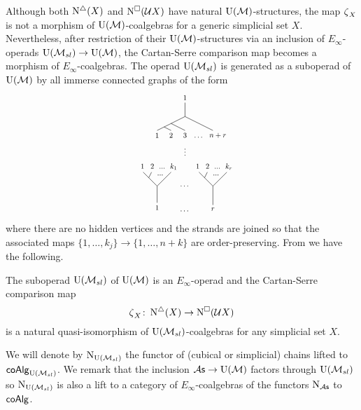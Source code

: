 Although both $\operatorname{N^{\triangle}}(X)$ and $\operatorname{N^{\square}}(\mathcal{U} X)$ have natural ${\operatorname{U}(\mathcal{M})}$-structures, the map $\operatorname{\zeta}_X$ is not a morphism of ${\operatorname{U}(\mathcal{M})}$-coalgebras for a generic simplicial set $X$.
Nevertheless, after restriction of their ${\operatorname{U}(\mathcal{M})}$-structures via an inclusion of $E_\infty$-operads ${\operatorname{U}(\mathcal{M}_{sl})} \to {\operatorname{U}(\mathcal{M})}$, the Cartan-Serre comparison map becomes a morphism of $E_\infty$-coalgebras.
The operad ${\operatorname{U}(\mathcal{M}_{sl})}$ is generated as a suboperad of ${\operatorname{U}(\mathcal{M})}$ by all immerse connected graphs of the form
\begin{equation*}
\begin{tikzpicture}[scale=1]
\draw (0,0)--(0,-.6) node[below, scale=.75]{$1$};
\draw (0,0)--(.5,.5);
\draw (-.3, .3)-- (-.2,.5) node[scale=.75] at (-.2,.7) {\qquad $1\, \ \ 2\ \ ...\ \ k_1$};
\draw (-.5,.5)--(0,0);
\node[scale=.75] at (.11,.4){$..$.};

\node[scale=.75] at (1,0){$\cdots$};
\node[scale=.75] at (1,-.9){$\cdots$};

\draw (2,0)--(2,-.68) node[scale=.75, below]{$r$};
\draw (2,0)--(2.5,.5);
\draw (1.7, .3)--(1.8,.5) node[scale=.75] at (1.78,.7) {\qquad $1\, \ \ 2\ \ ...\ \ k_r$};
\draw (1.5,.5)--(2,0);
\node[scale=.75] at (2.11,.4){$..$.};

\draw (1,2.5)--(1,3) node[scale=.75, above]{$1$};
\draw (1,2.5)--(0,2) node[scale=.75, below]{$1$};
\draw (.25,2.125)--(.5,2) node[scale=.75, below]{$2$};
\draw (.5,2.25)--(1,2) node[scale=.75, below]{$3$};
\draw (1,2.5)--(2,2) node[scale=.75, below]{\ \quad $n + r$};
\node[scale=.75] at (1.5,1.75){$\cdots$};

\node[scale=.75] at (1,1.3) {$\vdots$};

\node at (2.85,0){};
\end{tikzpicture}
\end{equation*}
where there are no hidden vertices and the strands are joined so that the associated maps $\{1, \dots, k_j\} \to \{1, \dots, n+k\}$ are order-preserving.
From \cite{medina2021cubical} we have the following.

\begin{proposition} \label{p:simplicialandcubical}
	The suboperad ${\operatorname{U}(\mathcal{M}_{sl})}$ of ${\operatorname{U}(\mathcal{M})}$ is an $E_\infty$-operad and the Cartan-Serre comparison map
	\[
	\operatorname{\zeta}_X \colon \operatorname{N^{\triangle}}(X) \to \operatorname{N^{\square}}(\mathcal U X)
	\]
	is a natural quasi-isomorphism of ${\operatorname{U}(\mathcal{M}_{sl})}$-coalgebras for any simplicial set $X$.
\end{proposition}

We will denote by $\operatorname{N}_{\operatorname{U}(\mathcal{M}_{sl})}$ the functor of (cubical or simplicial) chains lifted to $\mathsf{coAlg}_{\operatorname{U}(\mathcal{M}_{sl})}$.
We remark that the inclusion ${\mathcal{A}\mathsf{s}} \to {\operatorname{U}(\mathcal{M})}$ factors through ${\operatorname{U}(\mathcal{M}_{sl})}$ so $\operatorname{N}_{\operatorname{U}(\mathcal{M}_{sl})}$ is also a lift to a category of $E_\infty$-coalgebras of the functors $\operatorname{N}_{\mathcal{A}\mathsf{s}}$ to $\mathsf{coAlg}$.

